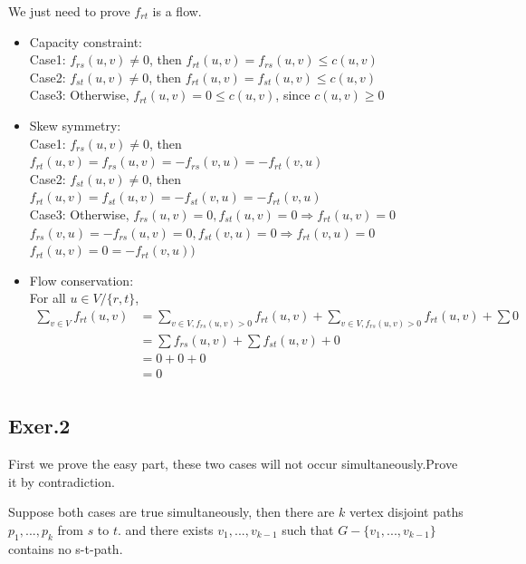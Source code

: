 \documentclass[UTF8]{ctexart}
\begin{document}
    We just need to prove $f_{rt}$ is a flow.
    \begin{itemize}
        \item Capacity constraint: \\
            Case1: $f_{rs}(u,v) \neq 0$, then $f_{rt}(u,v) = f_{rs}(u,v) \le c(u,v)$\\
            Case2: $f_{st}(u,v) \neq 0$, then $f_{rt}(u,v) = f_{st}(u,v) \le c(u,v)$\\
            Case3: Otherwise, $f_{rt}(u,v) = 0 \le c(u,v)$, since $c(u,v) \ge 0$\\
        \item Skew symmetry: \\
            Case1: $f_{rs}(u,v) \neq 0$, then $f_{rt}(u,v) = f_{rs}(u,v) = -f_{rs}(v,u) = -f_{rt}(v,u)$\\
            Case2: $f_{st}(u,v) \neq 0$, then $f_{rt}(u,v) = f_{st}(u,v) = -f_{st}(v,u) = -f_{rt}(v,u)$\\
            Case3: Otherwise, $f_{rs}(u,v) = 0, f_{st}(u,v) = 0 \Rightarrow f_{rt}(u,v) = 0$\\
                                $f_{rs}(v, u) = -f_{rs}(u,v) = 0, f_{st}(v,u) = 0 \Rightarrow f_{rt}(v,u) = 0$\\
                                $f_{rt}(u,v) = 0 = -f_{rt}(v,u))$\\
        \item Flow conservation: \\
            For all $u \in V / \{r,t\}$,
            $$
            \begin{aligned}
                \sum_{v \in V}f_{rt}(u, v) &=\sum_{v \in V, f_{rs}(u,v) > 0}f_{rt}(u,v) + \sum_{v \in V, f_{rs}(u,v) > 0}f_{rt}(u,v) + \sum 0\\
                & = \sum f_{rs}(u,v) + \sum f_{st}(u,v) + 0\\
                & = 0 + 0 + 0\\
                & = 0\\
            \end{aligned}
            $$
    \end{itemize}

\subsection*{Exer.2}
    First we prove the easy part, these two cases will not occur simultaneously.Prove it by contradiction.

    Suppose both cases are true simultaneously, then there are $k$ vertex disjoint paths $p_1, ..., p_k$ from $s$ to $t$.
    and there exists $v_1, ..., v_{k - 1}$ such that $G - \{ v_1, ...,v_{k - 1}\}$ contains no 
    s-t-path. 
    
\end{document}
